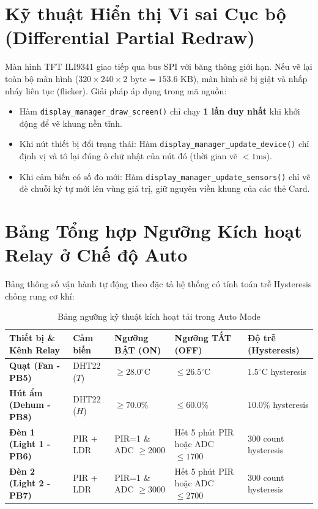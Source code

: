 \documentclass[11pt,a4paper]{article}
\begin{document}
\section{Kỹ thuật Hiển thị Vi sai Cục bộ (Differential Partial Redraw)}
Màn hình TFT ILI9341 giao tiếp qua bus SPI với băng thông giới hạn. Nếu vẽ lại toàn bộ màn hình ($320 \times 240 \times 2\text{ byte} = 153.6\text{ KB}$), màn hình sẽ bị giật và nhấp nháy liên tục (flicker). Giải pháp áp dụng trong mã nguồn:
\begin{itemize}
    \item Hàm \texttt{display\_manager\_draw\_screen()} chỉ chạy \textbf{1 lần duy nhất} khi khởi động để vẽ khung nền tĩnh.
    \item Khi nút thiết bị đổi trạng thái: Hàm \texttt{display\_manager\_update\_device()} chỉ định vị và tô lại đúng ô chữ nhật của nút đó (thời gian vẽ $< 1\text{ms}$).
    \item Khi cảm biến có số đo mới: Hàm \texttt{display\_manager\_update\_sensors()} chỉ vẽ đè chuỗi ký tự mới lên vùng giá trị, giữ nguyên viền khung của các thẻ Card.
\end{itemize}

\section{Bảng Tổng hợp Ngưỡng Kích hoạt Relay ở Chế độ Auto}
Bảng thông số vận hành tự động theo đặc tả hệ thống có tính toán trễ Hysteresis chống rung cơ khí:

\begin{table}[H]
\centering
\small
\begin{tabular}{@{}lllll@{}}
\toprule
\textbf{Thiết bị \& Kênh Relay} & \textbf{Cảm biến} & \textbf{Ngưỡng BẬT (ON)} & \textbf{Ngưỡng TẮT (OFF)} & \textbf{Độ trễ (Hysteresis)} \\ \midrule
\textbf{Quạt (Fan - PB5)} & DHT22 ($T$) & $\ge 28.0^\circ\text{C}$ & $\le 26.5^\circ\text{C}$ & $1.5^\circ\text{C}$ hysteresis \\
\textbf{Hút ẩm (Dehum - PB8)} & DHT22 ($H$) & $\ge 70.0\%$ & $\le 60.0\%$ & $10.0\%$ hysteresis \\
\textbf{Đèn 1 (Light 1 - PB6)} & PIR + LDR & PIR=1 \& ADC $\ge 2000$ & Hết 5 phút PIR hoặc ADC $\le 1700$ & 300 count hysteresis \\
\textbf{Đèn 2 (Light 2 - PB7)} & PIR + LDR & PIR=1 \& ADC $\ge 3000$ & Hết 5 phút PIR hoặc ADC $\le 2700$ & 300 count hysteresis \\ \bottomrule
\end{tabular}
\caption{Bảng ngưỡng kỹ thuật kích hoạt tải trong Auto Mode}
\label{tab:thresholds}
\end{table}
\end{document}

